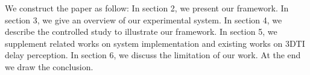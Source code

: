 
We construct the paper as follow: In section 2, we present our framework. In section 3, we give an overview of our experimental system. In section 4, we describe the controlled study to illustrate our framework. In section 5, we supplement related works on system implementation and existing works on 3DTI delay perception. In section 6, we discuss the limitation of our work. At the end we draw the conclusion.
